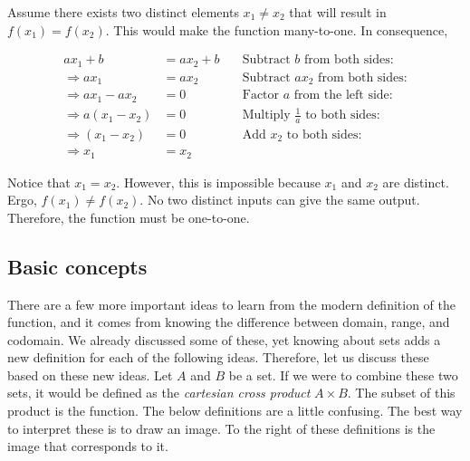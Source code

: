 Assume there exists two distinct elements $x _{1}\ne x _2$ that will result in $f\left( x
_{1} \right) =f\left( x _{2} \right)$. This would make the function many-to-one. In
consequence,



\begin{align} ax _{1} + b & = ax _{2} + b \quad & \text{Subtract } b \text{ from both sides:} \\ \Rightarrow ax _{1} & = ax _{2} \quad & \text{Subtract } ax _{2} \text{ from both sides:} \\ \Rightarrow ax _{1} - ax _{2} & = 0 \quad & \text{Factor } a \text{ from the left side:} \\ \Rightarrow a\left( x _{1} - x _{2} \right) & = 0 \quad & \text{Multiply } \frac{1}{a} \text{ to both sides:} \\ \Rightarrow \left( x _{1} - x _{2} \right) & = 0 \quad & \text{Add } x _{2} \text{ to both sides:} \\ \Rightarrow x _{1} & = x _{2} \end{align}



Notice that $x _{1}=x _{2}$. However, this is impossible because $x _{1}$ and $x _{2}$ are
distinct. Ergo, $f\left( x _{1} \right)\ne f\left( x _{2} \right)$. No two distinct inputs
can give the same output. Therefore, the function must be one-to-one.




\subsection{Basic concepts}
\label{sss:basi-3f1b}

There are a few more important ideas to
learn from the modern definition of the function, and it comes from knowing the difference
between domain, range, and codomain. We already discussed some of these, yet knowing about
sets adds a new definition for each of the following ideas. Therefore, let us discuss
these based on these new ideas. Let $A$ and $B$ be a set. If we were to combine these two
sets, it would be defined as the \textit{cartesian cross product} $A\times B$. The subset
of this product is the function. The below definitions are a little confusing. The best
way to interpret these is to draw an image. To the right of these definitions is the image
that corresponds to it.




